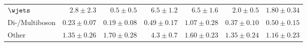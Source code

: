 \begin{table}
\begin{center}
{\begin{tabular}{lrrrrrr}
        $\wjets$         & $2.8 \pm 2.3$          & $0.5 \pm 0.5$          & $6.5 \pm 1.2$     & $6.5 \pm 1.6$          & $2.0 \pm 0.5$          & $1.80 \pm 0.34$              \\
        Di-/Multiboson       & $0.23 \pm 0.07$          & $0.19 \pm 0.08$          & $0.49 \pm 0.17$     & $1.07 \pm 0.28$          & $0.37 \pm 0.10$          & $0.50 \pm 0.15$              \\
       	Other      & $1.35\pm 0.26$          & $1.70 \pm 0.28$          & $4.3 \pm 0.7$      & $1.60\pm 0.23$          & $1.35 \pm 0.24$          & $1.16 \pm 0.23$              \\
\bottomrule
\end{tabular}
}
\end{center}
\caption{}\label{tab:results_bkg_only_VR}
\end{table}
%